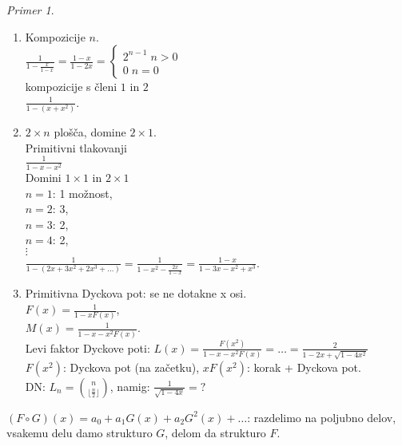 \documentclass[a4paper, 12pt]{book}
\theoremstyle{definition}
\theoremstyle{remark}
\newtheorem*{ex}{Primer}
\begin{document}
\begin{ex} \text{} \\
  \begin{enumerate}[label=(\arabic*)]
    \item Kompozicije $n$. \\
      $\frac{1}{1-\frac{x}{1-x}} = \frac{1-x}{1-2x} = \begin{cases}2^{n-1} \; n > 0 \\ 0 \; n = 0\end{cases}$ \\
      kompozicije s členi $1$ in $2$ \\
      $\frac{1}{1-(x+x^2)}$.
    \item $2 \times n$ plošča, domine $2 \times 1$. \\
      Primitivni tlakovanji \\
      $\frac{1}{1-x-x^2}$ \\
      Domini $1 \times 1$ in $2 \times 1$ \\
      $n = 1$: 1 možnost, \\
      $n = 2$: 3, \\
      $n = 3$: 2, \\
      $n = 4$: 2, \\
      $\vdots$ \\
      $\frac{1}{1-(2x + 3x^2 + 2x^3 + \dots)} = \frac{1}{1-x^2-\frac{2x}{1-x}} = \frac{1-x}{1-3x-x^2+x^3}$.
    \item Primitivna Dyckova pot: se ne dotakne x osi. \\
      $F(x) = \frac{1}{1 - x F(x)}$, \\
      $M(x) = \frac{1}{1 - x - x^2 F(x)}$. \\
      Levi faktor Dyckove poti: %
      $L(x) = \frac{F(x^2)}{1 - x - x^2 F(x)} = \dots = \frac{2}{1 - 2 x + \sqrt{1-4x^2}}$ \\
      $F(x^2)$: Dyckova pot (na začetku), $x F(x^2)$: korak + Dyckova pot. \\
      DN: $L_n = \binom{n}{\lfloor\frac{n}{2}\rfloor}$, namig: $\frac{1}{\sqrt{1-4x}} = ?$
  \end{enumerate}
\end{ex}
$(F \circ G)(x) = a_0 + a_1 G(x) + a_2 G^2(x) + \dots$: razdelimo na poljubno delov, vsakemu delu damo strukturo $G$,
delom da strukturo $F$.
\end{document}
